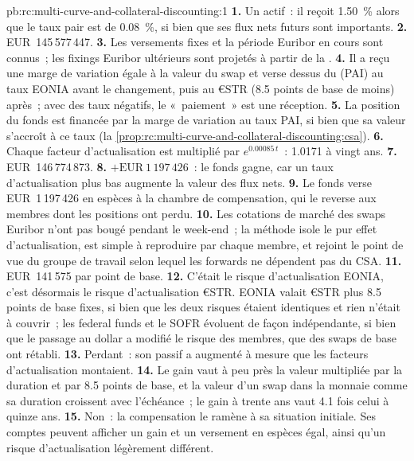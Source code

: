 \begin{solution}{pb:rc:multi-curve-and-collateral-discounting:1}
\textbf{1.} Un actif~: il reçoit 1.50~\% alors que le taux pair est de 0.08~\%, si bien que ses
flux nets futurs sont importants.
\textbf{2.} EUR~145\,577\,447.
\textbf{3.} Les versements fixes et la période Euribor en cours sont connus~; les fixings
Euribor ultérieurs sont projetés à partir de la .
\textbf{4.} Il a reçu une marge de variation égale à la valeur du swap et verse dessus
du  (PAI) au taux EONIA avant le changement, puis au €STR (8.5
points de base de moins) après~; avec des taux négatifs, le «~paiement~» est une réception.
\textbf{5.} La position du fonds est financée par la marge de variation au taux PAI, si bien que
sa valeur s'accroît à ce taux
(la \cref{prop:rc:multi-curve-and-collateral-discounting:csa}).
\textbf{6.} Chaque facteur d'actualisation est multiplié par $e^{0.00085\,t}$~: 1.0171 à
vingt ans.
\textbf{7.} EUR~146\,774\,873.
\textbf{8.} $+\text{EUR}~1\,197\,426$~: le fonds gagne, car un taux d'actualisation plus bas
augmente la valeur des flux nets.
\textbf{9.} Le fonds verse EUR~1\,197\,426 en espèces à la chambre de compensation, qui
le reverse aux membres dont les positions ont perdu.
\textbf{10.} Les cotations de marché des swaps Euribor n'ont pas bougé pendant le week-end~;
la méthode isole le pur effet d'actualisation, est simple à reproduire par chaque membre,
et rejoint le point de vue du groupe de travail selon lequel les forwards ne dépendent pas
du CSA.
\textbf{11.} EUR~141\,575 par point de base.
\textbf{12.} C'était le risque d'actualisation EONIA, c'est désormais le risque d'actualisation €STR.
EONIA valait €STR plus 8.5 points de base fixes, si bien que les deux risques étaient identiques
et rien n'était à couvrir~; les federal funds et le SOFR évoluent de façon indépendante, si bien que
le passage au dollar a modifié le risque des membres, que des swaps de base ont rétabli.
\textbf{13.} Perdant~: son passif a augmenté à mesure que les facteurs d'actualisation montaient.
\textbf{14.} Le gain vaut à peu près la valeur multipliée par la duration et par 8.5 points de base,
et la valeur d'un swap dans la monnaie comme sa duration croissent avec
l'échéance~; le gain à trente ans vaut 4.1 fois celui à quinze ans.
\textbf{15.} Non~: la compensation le ramène à sa situation initiale. Ses comptes peuvent
afficher un gain et un versement en espèces égal, ainsi qu'un risque d'actualisation légèrement différent.

\end{solution}
